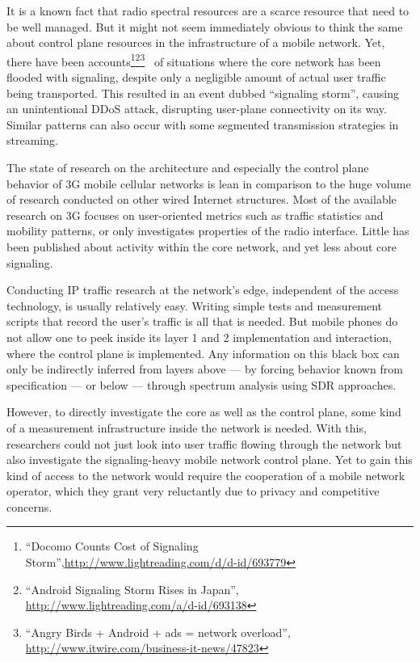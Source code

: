 It is a known fact that radio spectral resources are a scarce resource that need to be well managed. But it might not seem immediately obvious to think the same about control plane resources in the infrastructure of a mobile network. Yet, there have been accounts\footnote{``Docomo Counts Cost of Signaling Storm'',\url{http://www.lightreading.com/d/d-id/693779}}\footnote{``Android Signaling Storm Rises in Japan'', \url{http://www.lightreading.com/a/d-id/693138}}\footnote{``Angry Birds + Android + ads = network overload'', \url{http://www.itwire.com/business-it-news/47823}}~\cite{huawei2011storm} 
of situations where the core network has been flooded with signaling, despite only a negligible amount of actual user traffic being transported. This resulted in an event dubbed ``signaling storm'', causing an unintentional \gls{DDoS} attack, disrupting user-plane connectivity on its way. 
Similar patterns can also occur with some segmented transmission strategies in streaming.


The state of research on the architecture and especially the control plane behavior of \gls{3G} mobile cellular networks is lean in comparison to the huge volume of research conducted on other wired Internet structures. Most of the available research on \gls{3G} focuses on user-oriented metrics such as traffic statistics and mobility patterns, or only investigates properties of the radio interface. Little has been published about activity within the core network, and yet less about core signaling. 

Conducting \gls{IP} traffic research at the network's edge, independent of the access technology, is usually relatively easy. Writing simple tests and measurement scripts that record the user's traffic is all that is needed. But mobile phones do not allow one to peek inside its layer 1 and 2 implementation and interaction, where the control plane is implemented. Any information on this black box can only be indirectly inferred from layers above --- by forcing behavior known from specification --- or below --- through spectrum analysis using \gls{SDR} approaches. 

However, to directly investigate the core as well as the control plane, some kind of a measurement infrastructure inside the network is needed. With this, researchers could not just look into user traffic flowing through the network but also investigate the signaling-heavy mobile network control plane. Yet to gain this kind of access to the network  would require the cooperation of a mobile network operator, which they grant very reluctantly due to privacy and competitive concerns.

